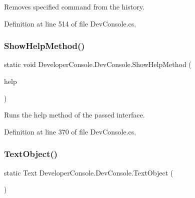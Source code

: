 Removes specified command from the history. 



Definition at line 514 of file Dev\+Console.\+cs.

\mbox{\label{class_developer_console_1_1_dev_console_a90e83c2a48ec1d0b2d55cfc9d49f44e7}} 
\subsubsection{\texorpdfstring{Show\+Help\+Method()}{ShowHelpMethod()}}
{\footnotesize\ttfamily static void Developer\+Console.\+Dev\+Console.\+Show\+Help\+Method (\begin{DoxyParamCaption}\item[{\hyperlink{class_developer_console_1_1_core_1_1_command_base}{Command\+Base}}]{help }\end{DoxyParamCaption})\hspace{0.3cm}{\ttfamily [static]}}



Runs the help method of the passed interface. 



Definition at line 370 of file Dev\+Console.\+cs.

\mbox{\label{class_developer_console_1_1_dev_console_aa561857615c2986c60519c4b1ef92b38}} 
\subsubsection{\texorpdfstring{Text\+Object()}{TextObject()}}
{\footnotesize\ttfamily static Text Developer\+Console.\+Dev\+Console.\+Text\+Object (\begin{DoxyParamCaption}{ }\end{DoxyParamCaption})\hspace{0.3cm}{\ttfamily [static]}}



